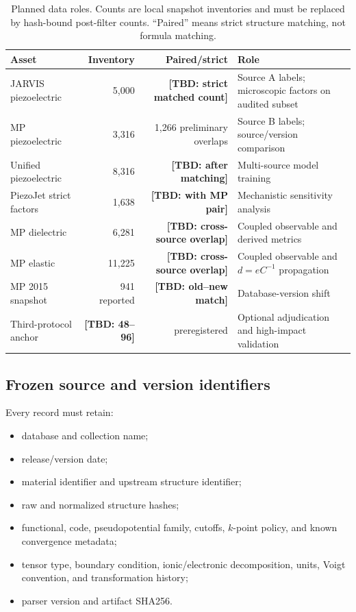 \documentclass[11pt]{article}
\newcommand{\TBD}[1]{\textcolor{red!75!black}{\textbf{[TBD: #1]}}}
\begin{document}
\begin{table}[t]
\centering
\caption{Planned data roles. Counts are local snapshot inventories and must be replaced by hash-bound post-filter counts. ``Paired'' means strict structure matching, not formula matching.}
\label{tab:data}
\begin{tabularx}{\linewidth}{lrrX}
\toprule
Asset & Inventory & Paired/strict & Role \\
\midrule
JARVIS piezoelectric & 5,000 & \TBD{strict matched count} & Source A labels; microscopic factors on audited subset \\
MP piezoelectric & 3,316 & 1,266 preliminary overlaps & Source B labels; source/version comparison \\
Unified piezoelectric & 8,316 & \TBD{after matching} & Multi-source model training \\
PiezoJet strict factors & 1,638 & \TBD{with MP pair} & Mechanistic sensitivity analysis \\
MP dielectric & 6,281 & \TBD{cross-source overlap} & Coupled observable and derived metrics \\
MP elastic & 11,225 & \TBD{cross-source overlap} & Coupled observable and $d=eC^{-1}$ propagation \\
MP 2015 snapshot & 941 reported & \TBD{old--new match} & Database-version shift \\
Third-protocol anchor & \TBD{48--96} & preregistered & Optional adjudication and high-impact validation \\
\bottomrule
\end{tabularx}
\end{table}

\subsection{Frozen source and version identifiers}

Every record must retain:
\begin{itemize}[leftmargin=1.5em]
    \item database and collection name;
    \item release/version date;
    \item material identifier and upstream structure identifier;
    \item raw and normalized structure hashes;
    \item functional, code, pseudopotential family, cutoffs, $k$-point policy, and known convergence metadata;
    \item tensor type, boundary condition, ionic/electronic decomposition, units, Voigt convention, and transformation history;
    \item parser version and artifact SHA256.
\end{itemize}
\end{document}
